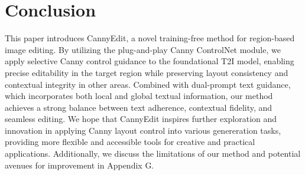 \documentclass{article}
\begin{document}





















\section{Conclusion}

This paper introduces CannyEdit, a novel training-free method for region-based image editing. By utilizing the plug-and-play Canny ControlNet module, we apply selective Canny control guidance to the foundational T2I model, enabling precise editability in the target region while preserving layout consistency and contextual integrity in other areas. Combined with dual-prompt text guidance, which incorporates both local and global textual information, our method achieves a strong balance between text adherence, contextual fidelity, and seamless editing. We hope that CannyEdit inspires further exploration and innovation in applying Canny layout control into various genereration tasks, providing more flexible and accessible tools for creative and practical applications.  Additionally, we discuss the limitations of our method and potential avenues for improvement in Appendix G.
\end{document}
